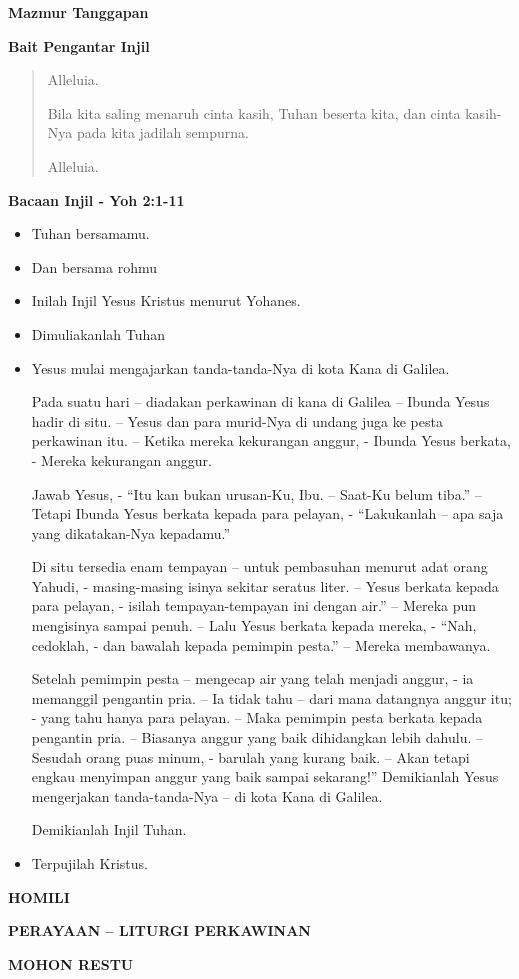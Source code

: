 \documentclass[a5paper,titlepage,11pt,openany]{scrbook}
\makeatletter
\newcommand{\judul}[1]{%
  {\parindent \z@ \centering 
    \interlinepenalty\@M \Large \bfseries #1\par\nobreak \vskip 20\p@ }}
\newcommand{\subjudul}[1]{%
  {\parindent \z@ 
    \interlinepenalty\@M \large \bfseries #1\par\nobreak \vskip 10\p@ }}
\newcommand{\subsubjudul}[1]{%
  {\parindent \z@ 
    \interlinepenalty\@M \bfseries #1\par\nobreak \vskip 10\p@ }}
\newcommand{\BU}[1]{\begin{itemize} \item[U:] #1 \end{itemize}}
\newcommand{\BI}[1]{\begin{itemize} \item[I:] #1 \end{itemize}}
\makeatother
\begin{document}
\subsubjudul{Mazmur Tanggapan}

\subsubjudul{Bait Pengantar Injil}

\begin{quote}
Alleluia.

         Bila kita saling menaruh cinta kasih, Tuhan beserta kita, dan cinta kasih-Nya pada kita jadilah sempurna.

Alleluia.
\end{quote}

\subsubjudul{Bacaan Injil - Yoh 2:1-11}

\BI{Tuhan bersamamu.}
\BU{Dan bersama rohmu}
\BI{Inilah Injil Yesus Kristus menurut Yohanes.}
\BU{Dimuliakanlah Tuhan}

\BI{Yesus mulai mengajarkan tanda-tanda-Nya di kota Kana di Galilea.

         Pada suatu hari – diadakan perkawinan di kana  di Galilea – Ibunda Yesus hadir di situ. – Yesus dan para murid-Nya di undang juga ke pesta perkawinan itu. – Ketika mereka kekurangan anggur, - Ibunda Yesus berkata, - Mereka kekurangan anggur.

         Jawab Yesus, - “Itu kan bukan urusan-Ku, Ibu. – Saat-Ku belum tiba.” – Tetapi Ibunda Yesus berkata kepada para pelayan, - “Lakukanlah – apa saja yang dikatakan-Nya kepadamu.”

         Di situ tersedia enam tempayan – untuk pembasuhan menurut adat orang Yahudi, - masing-masing isinya sekitar seratus liter. – Yesus berkata kepada para pelayan, - isilah tempayan-tempayan ini dengan air.” – Mereka pun mengisinya sampai penuh. – Lalu Yesus berkata kepada mereka, - “Nah, cedoklah, - dan bawalah kepada pemimpin pesta.” – Mereka membawanya.

         Setelah pemimpin pesta – mengecap air yang telah menjadi anggur, - ia memanggil pengantin pria. – Ia tidak tahu – dari mana datangnya anggur itu; - yang tahu hanya para pelayan. – Maka pemimpin pesta berkata kepada pengantin pria. – Biasanya anggur yang baik dihidangkan lebih dahulu. – Sesudah orang puas minum, - barulah yang kurang baik. – Akan tetapi engkau menyimpan anggur yang baik sampai sekarang!” Demikianlah Yesus mengerjakan tanda-tanda-Nya – di kota Kana di Galilea.

Demikianlah Injil Tuhan.}

\BU{Terpujilah Kristus.}


\subjudul{HOMILI}

\judul{PERAYAAN – LITURGI  PERKAWINAN}


\subjudul{MOHON RESTU}
\end{document}
